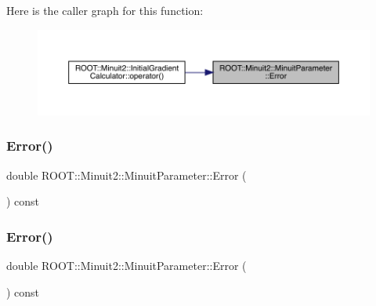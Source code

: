 Here is the caller graph for this function\+:
\nopagebreak
\begin{figure}[H]
\begin{center}
\leavevmode
\includegraphics[width=350pt]{dd/dfb/classROOT_1_1Minuit2_1_1MinuitParameter_af92997a2e9a7209fbddd286bbd1dbc3d_icgraph}
\end{center}
\end{figure}
\mbox{\label{classROOT_1_1Minuit2_1_1MinuitParameter_af92997a2e9a7209fbddd286bbd1dbc3d}} 
\subsubsection{\texorpdfstring{Error()}{Error()}\hspace{0.1cm}{\footnotesize\ttfamily [2/3]}}
{\footnotesize\ttfamily double R\+O\+O\+T\+::\+Minuit2\+::\+Minuit\+Parameter\+::\+Error (\begin{DoxyParamCaption}{ }\end{DoxyParamCaption}) const\hspace{0.3cm}{\ttfamily [inline]}}

\mbox{\label{classROOT_1_1Minuit2_1_1MinuitParameter_af92997a2e9a7209fbddd286bbd1dbc3d}} 
\subsubsection{\texorpdfstring{Error()}{Error()}\hspace{0.1cm}{\footnotesize\ttfamily [3/3]}}
{\footnotesize\ttfamily double R\+O\+O\+T\+::\+Minuit2\+::\+Minuit\+Parameter\+::\+Error (\begin{DoxyParamCaption}{ }\end{DoxyParamCaption}) const\hspace{0.3cm}{\ttfamily [inline]}}


